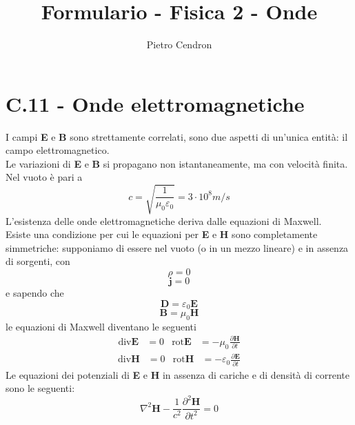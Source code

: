 \documentclass{article}
\title{Formulario - Fisica 2 - Onde}
\author{Pietro Cendron}
\begin{document}
\maketitle

\section*{C.11 - Onde elettromagnetiche}
I campi \textbf{E} e \textbf{B}  sono strettamente correlati, sono due aspetti di un’unica entità: il campo elettromagnetico.\\Le variazioni di \textbf{E} e \textbf{B} si propagano non istantaneamente,
ma con velocità finita. \\ Nel vuoto è pari a 
\begin{equation}
c = \sqrt{\frac{1}{\mu_0\varepsilon_0}}=3\cdot10^8 m/s 
\nonumber
\end{equation}
L’esistenza delle onde elettromagnetiche deriva dalle equazioni di Maxwell.\\
Esiste una condizione per cui le equazioni per \textbf{E} e \textbf{H} sono completamente simmetriche: supponiamo di essere nel vuoto (o in un mezzo lineare) e in assenza di sorgenti, con 
\begin{equation}
\rho=0 
\nonumber
\end{equation}
\begin{equation}
\textbf{j}=0
\nonumber
\end{equation}
e sapendo che
\begin{equation}
\textbf{D}=\varepsilon_0\textbf{E}
\nonumber
\end{equation}
\begin{equation}
\textbf{B}=\mu_0\textbf{H}
\nonumber
\end{equation}
le equazioni di Maxwell diventano le seguenti
\begin{align*}
\text{div}\textbf{E}&=0  &  \text{rot}\textbf{E}&=-\mu_0\frac{\partial\textbf{H}}{\partial t}
\nonumber
\end{align*}
\begin{align*}
\text{div}\textbf{H}&=0  &  \text{rot}\textbf{H}&=-\varepsilon_0\frac{\partial\textbf{E}}{\partial t}
\nonumber
\end{align*}
Le equazioni dei potenziali di \textbf{E} e \textbf{H} in assenza di cariche e di densità di corrente sono le seguenti:
\begin{equation}
\nabla^2\textbf{H}-\frac{1}{c^2}\frac{\partial^2\textbf{H}}{\partial t^2}=0  
\nonumber
\end{equation}
\end{document}

